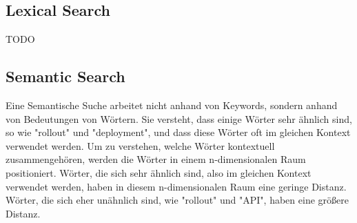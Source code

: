 \subsection{Lexical Search}
TODO

\subsection{Semantic Search}
Eine Semantische Suche arbeitet nicht anhand von Keywords, sondern anhand von Bedeutungen von Wörtern. Sie versteht, dass einige Wörter sehr ähnlich sind, so wie "rollout" und "deployment", und dass diese Wörter oft im gleichen Kontext verwendet werden. Um zu verstehen, welche Wörter kontextuell zusammengehören, werden die Wörter in einem n-dimensionalen Raum positioniert. Wörter, die sich sehr ähnlich sind, also im gleichen Kontext verwendet werden, haben in diesem n-dimensionalen Raum eine geringe Distanz. Wörter, die sich eher unähnlich sind, wie "rollout" und "API", haben eine größere Distanz. 

